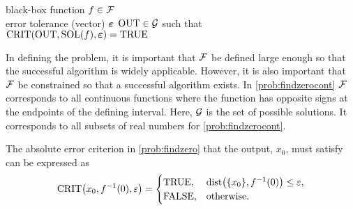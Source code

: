 \begin{NumProblem}
\label{prob:generalProblem}
{black-box function $f \in \mathcal{F}$ \\ error tolerance (vector) $\boldsymbol{\varepsilon}$}
{$\operatorname{OUT} \in \mathcal{G}$ such that \\ \qquad $\operatorname{CRIT}(\operatorname{OUT},\operatorname{SOL}(f),\boldsymbol{\varepsilon}) = \textup{TRUE}$}
\end{NumProblem}
In defining the problem, it is important that $\mathcal{F}$ be defined large enough so that the successful algorithm is widely applicable.  However, it is also important that $\mathcal{F}$ be constrained so that a successful algorithm exists.  In \cref{prob:findzerocont} $\mathcal{F}$ corresponds to all continuous functions where the function has opposite signs at the endpoints of the defining interval.  Here, $\mathcal{G}$ is the set of possible solutions.  It corresponds to all subsets of real numbers for \cref{prob:findzerocont}.  

The absolute error criterion in \cref{prob:findzero} that the output, $x_0$, must satisfy can be expressed as 
\begin{equation}
    \operatorname{CRIT}\bigl(x_0,f^{-1}(0),\varepsilon\bigr) = 
    \begin{cases} \textup{TRUE}, & \operatorname{dist}\bigl(\{x_0\},f^{-1}(0)\bigr) \le \varepsilon,\\
    \textup{FALSE}, & \text{otherwise}.
    \end{cases}
\end{equation}





